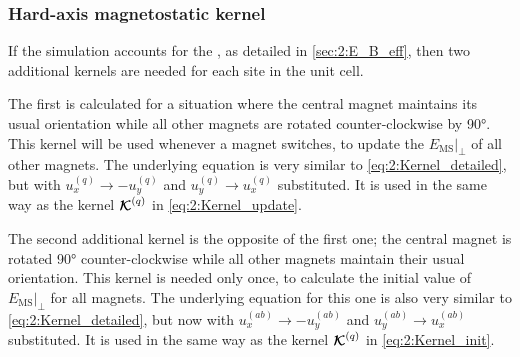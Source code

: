 \vspace{-1em}

\subsubsection{Hard-axis magnetostatic kernel}\label{sec:2:Kernels:Perp}
If the simulation accounts for the , as detailed in \cref{sec:2:E_B_eff}, then two additional kernels are needed for each site in the unit cell. \par
The first is calculated for a situation where the central magnet maintains its usual orientation while all other magnets are rotated counter-clockwise by \ang{90}.
This kernel will be used whenever a magnet switches, to update the  $\left. E_{\mathrm{MS}} \right|_{\perp}$ of all other magnets.
The underlying equation is very similar to \cref{eq:2:Kernel_detailed}, but with $u_x^{(q)} \rightarrow -u_y^{(q)}$ and $u_y^{(q)} \rightarrow u_x^{(q)}$ substituted.
It is used in the same way as the kernel $\boldsymbol{\mathbf{\mathcal{K}}}^{(q)}$ in \cref{eq:2:Kernel_update}. \par
The second additional kernel is the opposite of the first one; the central magnet is rotated \ang{90} counter-clockwise while all other magnets maintain their usual orientation.
This kernel is needed only once, to calculate the initial value of $\left. E_{\mathrm{MS}} \right|_{\perp}$ for all magnets.
The underlying equation for this one is also very similar to \cref{eq:2:Kernel_detailed}, but now with $u_x^{(ab)} \rightarrow -u_y^{(ab)}$ and $u_y^{(ab)} \rightarrow u_x^{(ab)}$ substituted.
It is used in the same way as the kernel $\boldsymbol{\mathbf{\mathcal{K}}}^{(q)}$ in \cref{eq:2:Kernel_init}.


